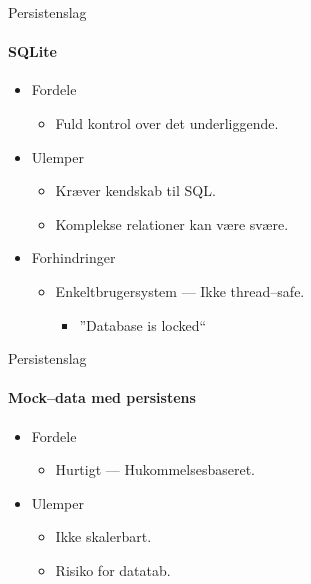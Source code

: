 \begin{frame}{Persistenslag}
  \framesubtitle{SQLite}
  \begin{itemize}
    \item<1-> Fordele
    \begin{itemize}
      \item<1-> Fuld kontrol over det underliggende.
    \end{itemize}
    \item<2-> Ulemper
    \begin{itemize}
      \item<2-> Kræver kendskab til SQL.
      \item<2-> Komplekse relationer kan være svære.
    \end{itemize}
    \item<3-> Forhindringer
    \begin{itemize}
      \item<3-> Enkeltbrugersystem --- Ikke thread--safe.
      \begin{itemize}
        \item<3-> ''Database is locked``
      \end{itemize}
    \end{itemize}
  \end{itemize}
\end{frame}

\begin{frame}{Persistenslag}
  \framesubtitle{Mock--data med persistens}
  \begin{itemize}
    \item<1-> Fordele
    \begin{itemize}
      \item<1-> Hurtigt --- Hukommelsesbaseret.
    \end{itemize}
    \item<2-> Ulemper
    \begin{itemize}
      \item<2-> Ikke skalerbart.
      \item<2-> Risiko for datatab.
    \end{itemize}
  \end{itemize}
\end{frame}